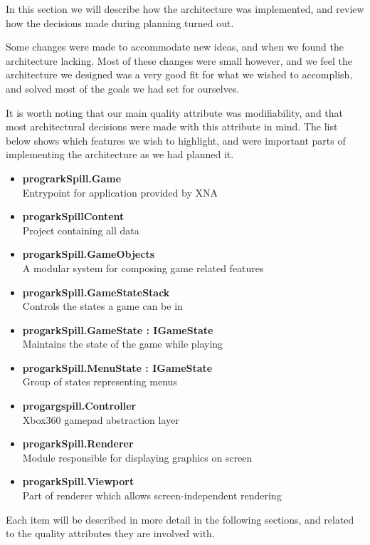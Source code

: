 
In this section we will describe how the architecture was implemented, and
review how the decisions made during planning turned out.

Some changes were made to accommodate new ideas, and when we found the
architecture lacking. Most of these changes were small however, and we feel
the architecture we designed was a very good fit for what we wished to
accomplish, and solved most of the goals we had set for ourselves.

It is worth noting that our main quality attribute was modifiability, and
that most architectural decisions were made with this attribute in mind.
The list below shows which features we wish to highlight, and were important
parts of implementing the architecture as we had planned it.

\begin{itemize}
	\item \textbf{prograrkSpill.Game} \\
	      Entrypoint for application provided by XNA
	\item \textbf{progarkSpillContent} \\
	      Project containing all data
  	\item \textbf{progarkSpill.GameObjects} \\
  	      A modular system for composing game related features
  	\item \textbf{progarkSpill.GameStateStack} \\
  	      Controls the states a game can be in		
	\item \textbf{progarkSpill.GameState : IGameState} \\
	      Maintains the state of the game while playing
	\item \textbf{progarkSpill.MenuState : IGameState} \\
	      Group of states representing menus
	\item \textbf{progargspill.Controller} \\
	      Xbox360 gamepad abstraction layer
	\item \textbf{progarkSpill.Renderer} \\
	      Module responsible for displaying graphics on screen
	\item \textbf{progarkSpill.Viewport} \\
	      Part of renderer which allows screen-independent rendering
\end{itemize}

Each item will be described in more detail in the following sections, and
related to the quality attributes they are involved with.

